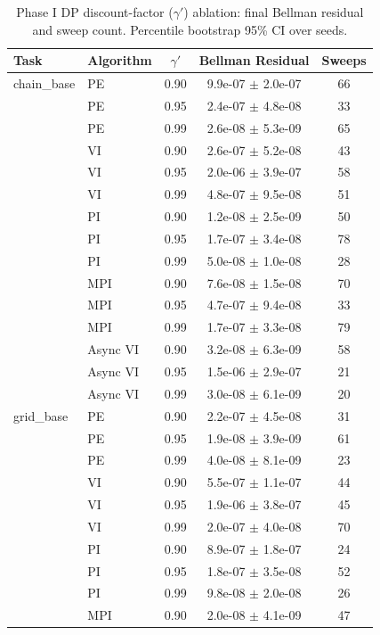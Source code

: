 \begin{table}[t]
\centering
\caption{Phase I DP discount-factor ($\gamma'$) ablation: final Bellman residual and sweep count. Percentile bootstrap 95\% CI over seeds.}
\label{tab:p1d-dp}
\begin{tabular}{llccc}
\toprule
Task & Algorithm & $\gamma'$ & Bellman Residual & Sweeps \\
\midrule
  chain\_base & PE & 0.90 & 9.9e-07 $\pm$ 2.0e-07 & 66 \\
   & PE & 0.95 & 2.4e-07 $\pm$ 4.8e-08 & 33 \\
   & PE & 0.99 & 2.6e-08 $\pm$ 5.3e-09 & 65 \\
   & VI & 0.90 & 2.6e-07 $\pm$ 5.2e-08 & 43 \\
   & VI & 0.95 & 2.0e-06 $\pm$ 3.9e-07 & 58 \\
   & VI & 0.99 & 4.8e-07 $\pm$ 9.5e-08 & 51 \\
   & PI & 0.90 & 1.2e-08 $\pm$ 2.5e-09 & 50 \\
   & PI & 0.95 & 1.7e-07 $\pm$ 3.4e-08 & 78 \\
   & PI & 0.99 & 5.0e-08 $\pm$ 1.0e-08 & 28 \\
   & MPI & 0.90 & 7.6e-08 $\pm$ 1.5e-08 & 70 \\
   & MPI & 0.95 & 4.7e-07 $\pm$ 9.4e-08 & 33 \\
   & MPI & 0.99 & 1.7e-07 $\pm$ 3.3e-08 & 79 \\
   & Async VI & 0.90 & 3.2e-08 $\pm$ 6.3e-09 & 58 \\
   & Async VI & 0.95 & 1.5e-06 $\pm$ 2.9e-07 & 21 \\
   & Async VI & 0.99 & 3.0e-08 $\pm$ 6.1e-09 & 20 \\
  grid\_base & PE & 0.90 & 2.2e-07 $\pm$ 4.5e-08 & 31 \\
   & PE & 0.95 & 1.9e-08 $\pm$ 3.9e-09 & 61 \\
   & PE & 0.99 & 4.0e-08 $\pm$ 8.1e-09 & 23 \\
   & VI & 0.90 & 5.5e-07 $\pm$ 1.1e-07 & 44 \\
   & VI & 0.95 & 1.9e-06 $\pm$ 3.8e-07 & 45 \\
   & VI & 0.99 & 2.0e-07 $\pm$ 4.0e-08 & 70 \\
   & PI & 0.90 & 8.9e-07 $\pm$ 1.8e-07 & 24 \\
   & PI & 0.95 & 1.8e-07 $\pm$ 3.5e-08 & 52 \\
   & PI & 0.99 & 9.8e-08 $\pm$ 2.0e-08 & 26 \\
   & MPI & 0.90 & 2.0e-08 $\pm$ 4.1e-09 & 47 \\

\end{tabular}
\end{table}
